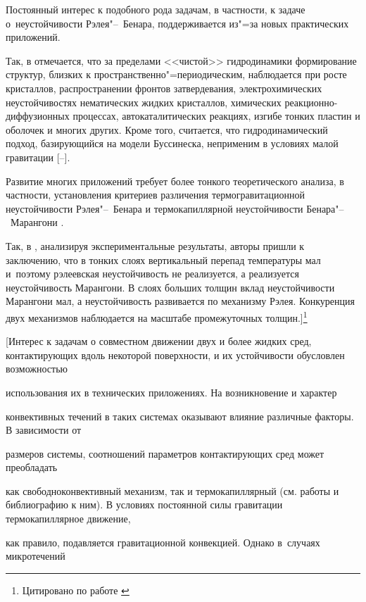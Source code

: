 Постоянный интерес к подобного рода задачам, в частности, к задаче о~неустойчивости Рэлея"--~Бенара, поддерживается из"=за новых практических приложений. 

Так, в \cite{lukashev:bib13,lukashev:bib14} отмечается, что за пределами <<чистой>> гидродинамики формирование структур, близких к пространственно"=периодическим, наблюдается при росте кристаллов, распространении фронтов затвердевания, электрохимических неустойчивостях нематических жидких кристаллов, химических реакционно-диффузионных процессах, автокаталитических реакциях, изгибе тонких пластин и оболочек и многих других. Кроме того, считается, что гидродинамический подход, базирующийся на модели Буссинеска, неприменим в условиях малой гравитации [--].

Развитие многих приложений требует более тонкого теоретического анализа, в частности, установления критериев различения термогравитационной неустойчивости Рэлея"--~Бенара \cite{lukashev:bib13,lukashev:bib14} и термокапиллярной неустойчивости Бенара"--~Марангони \cite{lukashev:bib19}. 

Так, в \cite{lukashev:bib1}, анализируя экспериментальные результаты, авторы пришли к заключению, что в тонких слоях вертикальный перепад температуры мал и~поэтому рэлеевская неустойчивость не реализуется, а реализуется неустойчивость Марангони. В слоях больших толщин вклад неустойчивости Марангони мал, а неустойчивость развивается по механизму Рэлея. Конкуренция двух механизмов наблюдается на масштабе промежуточных толщин.]\footnote{Цитировано по работе \cite[с. 23--24]{lukashev:add1}}



[Интерес к задачам о совместном движении двух и более жидких сред, контактирующих вдоль некоторой поверхности, и их устойчивости обусловлен возможностью

использования их в технических приложениях. На возникновение и характер

конвективных течений в таких системах оказывают влияние различные факторы. В зависимости от

размеров системы, соотношений параметров контактирующих сред может преобладать

как свободноконвективный механизм, так и термокапиллярный (см. работы \cite{lukashev:bib1,lukashev:bib20,lukashev:bib21} и библиографию к ним). В условиях постоянной силы гравитации термокапиллярное движение,

как правило, подавляется гравитационной конвекцией. Однако в~случаях микротечений

